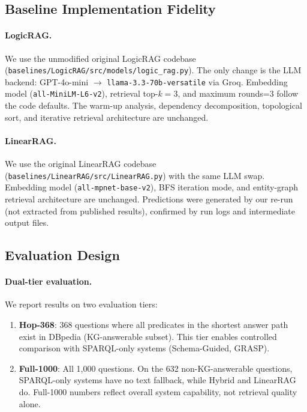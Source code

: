 \subsection{Baseline Implementation Fidelity}
\label{sec:baseline-fidelity}

\paragraph{LogicRAG.}
We use the unmodified original LogicRAG codebase (\texttt{baselines/LogicRAG/src/models/logic\_rag.py}). The only change is the LLM backend: GPT-4o-mini $\to$ \texttt{llama-3.3-70b-versatile} via Groq. Embedding model (\texttt{all-MiniLM-L6-v2}), retrieval top-$k=3$, and maximum rounds=3 follow the code defaults. The warm-up analysis, dependency decomposition, topological sort, and iterative retrieval architecture are unchanged.

\paragraph{LinearRAG.}
We use the original LinearRAG codebase (\texttt{baselines/LinearRAG/src/LinearRAG.py}) with the same LLM swap. Embedding model (\texttt{all-mpnet-base-v2}), BFS iteration mode, and entity-graph retrieval architecture are unchanged. Predictions were generated by our re-run (not extracted from published results), confirmed by run logs and intermediate output files.

\subsection{Evaluation Design}
\label{sec:eval-design}

\paragraph{Dual-tier evaluation.}
We report results on two evaluation tiers:
\begin{enumerate}
\item \textbf{Hop-368}: 368 questions where all predicates in the shortest answer path exist in DBpedia (KG-answerable subset). This tier enables controlled comparison with SPARQL-only systems (Schema-Guided, GRASP).
\item \textbf{Full-1000}: All 1{,}000 questions. On the 632 non-KG-answerable questions, SPARQL-only systems have no text fallback, while Hybrid and LinearRAG do. Full-1000 numbers reflect overall system capability, not retrieval quality alone.
\end{enumerate}

